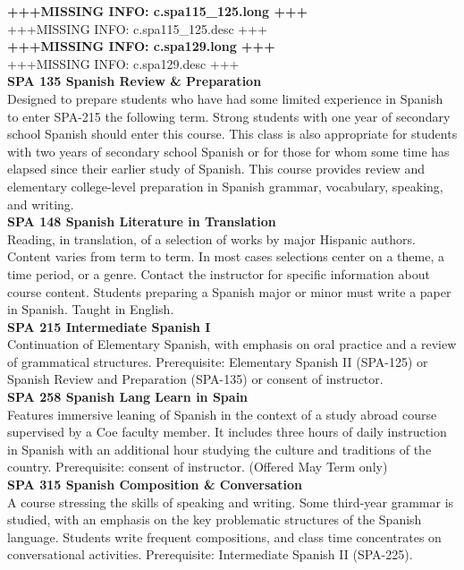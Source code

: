 \documentclass[
  letterpaper,
]{scrbook}
\begin{document}
\textbf{+++MISSING INFO: c.spa115\_125.long +++}\\
+++MISSING INFO: c.spa115\_125.desc +++\\
\textbf{+++MISSING INFO: c.spa129.long +++}\\
+++MISSING INFO: c.spa129.desc +++\\
\textbf{SPA 135 Spanish Review \& Preparation}\\
Designed to prepare students who have had some limited experience in
Spanish to enter SPA-215 the following term. Strong students with one
year of secondary school Spanish should enter this course. This class is
also appropriate for students with two years of secondary school Spanish
or for those for whom some time has elapsed since their earlier study of
Spanish. This course provides review and elementary college-level
preparation in Spanish grammar, vocabulary, speaking, and writing.\\
\textbf{SPA 148 Spanish Literature in Translation}\\
Reading, in translation, of a selection of works by major Hispanic
authors. Content varies from term to term. In most cases selections
center on a theme, a time period, or a genre. Contact the instructor for
specific information about course content. Students preparing a Spanish
major or minor must write a paper in Spanish. Taught in English.\\
\textbf{SPA 215 Intermediate Spanish I}\\
Continuation of Elementary Spanish, with emphasis on oral practice and a
review of grammatical structures. Prerequisite: Elementary Spanish II
(SPA-125) or Spanish Review and Preparation (SPA-135) or consent of
instructor.\\
\textbf{SPA 258 Spanish Lang Learn in Spain}\\
Features immersive leaning of Spanish in the context of a study abroad
course supervised by a Coe faculty member. It includes three hours of
daily instruction in Spanish with an additional hour studying the
culture and traditions of the country. Prerequisite: consent of
instructor. (Offered May Term only)\\
\textbf{SPA 315 Spanish Composition \& Conversation}\\
A course stressing the skills of speaking and writing. Some third-year
grammar is studied, with an emphasis on the key problematic structures
of the Spanish language. Students write frequent compositions, and class
time concentrates on conversational activities. Prerequisite:
Intermediate Spanish II (SPA-225).\\
\end{document}
